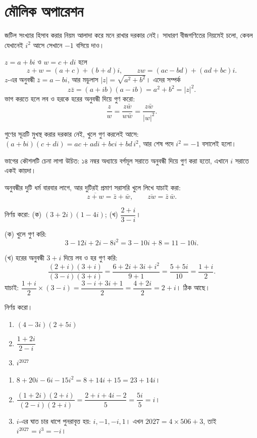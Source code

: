 \documentclass[11pt]{article}
\begin{document}
\section{মৌলিক অপারেশন}

জটিল সংখ্যার হিসাব করার নিয়ম আলাদা করে মনে রাখার দরকার নেই। সাধারণ বীজগণিতের
নিয়মেই চলো, কেবল যেখানেই $i^{2}$ আসে সেখানে $-1$ বসিয়ে দাও।

\begin{idea}[চারটি অপারেশন]
$z = a+bi$ ও $w = c+di$ হলে
\[
  z + w = (a+c) + (b+d)i, \qquad
  zw = (ac - bd) + (ad + bc)i .
\]
$z$-এর অনুবন্ধী $\bar{z} = a - bi$, আর মডুলাস $|z| = \sqrt{a^{2}+b^{2}}$।
এদের সম্পর্ক
\[
  z\bar{z} =(a+ib)(a-ib)= a^{2}+b^{2} = |z|^{2} .
\]
ভাগ করতে হলে লব ও হরকে হরের অনুবন্ধী দিয়ে গুণ করো:
\[
  \frac{z}{w} = \frac{z\bar{w}}{w\bar{w}} = \frac{z\bar{w}}{|w|^{2}} .
\]
\end{idea}

গুণের সূত্রটি মুখস্থ করার দরকার নেই, খুলে গুণ করলেই আসে:
$(a+bi)(c+di) = ac + adi + bci + bd\,i^{2}$, আর শেষ পদে $i^{2} = -1$ বসালেই
হলো।

ভাগের কৌশলটি চেনা লাগা উচিত: ১৪ নম্বর অধ্যায়ে বর্গমূল সরাতে অনুবন্ধী দিয়ে
গুণ করা হতো, এখানে $i$ সরাতে একই কায়দা।

অনুবন্ধীর দুটি ধর্ম বারবার লাগে, আর দুটিরই প্রমাণ সরাসরি খুলে লিখে যাচাই করা:
\[
  \overline{z+w} = \bar{z}+\bar{w}, \qquad \overline{zw} = \bar{z}\,\bar{w} .
\]

\begin{example}
নির্ণয় করো: (ক) $(3+2i)(1-4i)$; (খ) $\dfrac{2+i}{3-i}$।
\end{example}

\begin{solbox}
(ক) খুলে গুণ করি:
\[
  3 - 12i + 2i - 8i^{2} = 3 - 10i + 8 = 11 - 10i .
\]

(খ) হরের অনুবন্ধী $3+i$ দিয়ে লব ও হর গুণ করি:
\[
  \frac{(2+i)(3+i)}{(3-i)(3+i)} = \frac{6 + 2i + 3i + i^{2}}{9+1}
  = \frac{5 + 5i}{10} = \frac{1+i}{2} .
\]
যাচাই: $\dfrac{1+i}{2} \times (3-i) = \dfrac{3 - i + 3i + 1}{2}
= \dfrac{4+2i}{2} = 2+i$। ঠিক আছে।
\end{solbox}

 নির্ণয় করো।
\begin{enumerate}
  \item $(4-3i)(2+5i)$
  \item $\dfrac{1+2i}{2-i}$
  \item $i^{2027}$
\end{enumerate}

\begin{sol}
\begin{enumerate}
  \item $8 + 20i - 6i - 15i^{2} = 8 + 14i + 15 = 23 + 14i$।
  \item $\dfrac{(1+2i)(2+i)}{(2-i)(2+i)} = \dfrac{2+i+4i-2}{5}
        = \dfrac{5i}{5} = i$।
  \item $i$-এর ঘাত চার ধাপে পুনরাবৃত্ত হয়: $i, -1, -i, 1$। এখন
        $2027 = 4 \times 506 + 3$, তাই $i^{2027} = i^{3} = -i$।
\end{enumerate}
\end{sol}
\end{document}

